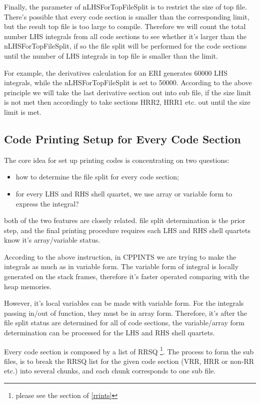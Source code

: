 Finally, the parameter of nLHSForTopFileSplit is to restrict the size of top file.
There's possible that every code section is smaller than the corresponding limit,
but the result top file is too large to compile. Therefore we will count the 
total number LHS integrals from all code sections to see whether it's larger than
the nLHSForTopFileSplit, if so the file split will be performed for the code sections
until the number of LHS integrals in top file is smaller than the limit.

For example, the derivatives calculation for an ERI generates 60000 LHS integrals, while
the nLHSForTopFileSplit is set to 50000. According to the above principle we will take
the last derivative section out into sub file, if the size limit is not met then accordingly
to take sections HRR2, HRR1 etc. out until the size limit is met.

\subsection{Code Printing Setup for Every Code Section}
\label{code_generation_print}

The core idea for set up printing codes is concentrating on two questions:
\begin{itemize}
 \item how to determine the file split for every code section;
 \item for every LHS and RHS shell quartet, we use array or variable
 form to express the integral?
\end{itemize}
both of the two features are closely related. file split determination
is the prior step, and the final printing procedure requires each LHS and RHS 
shell quartets know it's array/variable status.

According to the above instruction, in CPPINTS we are trying to make the integrals 
as much as in variable form. The variable form of integral is locally generated on
the stack frames, therefore it's faster operated comparing with the heap memories.

However, it's local variables can be made with variable form. For the integrals
passing in/out of function, they must be in array form. Therefore, it's after 
the file split status are determined for all of code sections, the variable/array
form determination can be processed for the LHS and RHS shell quartets.

Every code section is composed by a list of RRSQ \footnote{please
see the section of \ref{rrints}}. The process to form the sub files, 
is to break the RRSQ list for the given code section (VRR, HRR or non-RR etc.)
into several chunks, and each chunk corresponds to one sub file.

